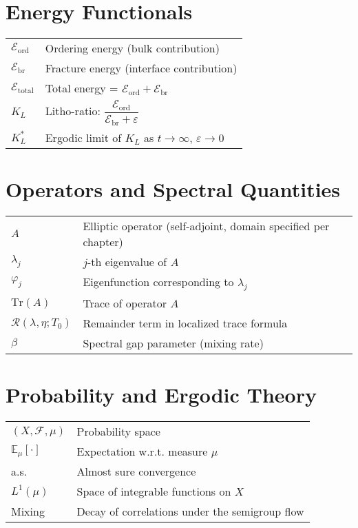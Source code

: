 \section*{Energy Functionals}
\begin{tabular}{ll}
$\mathcal{E}_{\text{ord}}$ & Ordering energy (bulk contribution) \\
$\mathcal{E}_{\text{br}}$ & Fracture energy (interface contribution) \\
$\mathcal{E}_{\text{total}}$ & Total energy = $\mathcal{E}_{\text{ord}} + \mathcal{E}_{\text{br}}$ \\
$K_L$ & Litho-ratio: $\dfrac{\mathcal{E}_{\text{ord}}}{\mathcal{E}_{\text{br}} + \varepsilon}$ \\
$K_L^*$ & Ergodic limit of $K_L$ as $t \to \infty$, $\varepsilon \to 0$ \\
\end{tabular}

\section*{Operators and Spectral Quantities}
\begin{tabular}{ll}
$A$ & Elliptic operator (self-adjoint, domain specified per chapter) \\
$\lambda_j$ & $j$-th eigenvalue of $A$ \\
$\varphi_j$ & Eigenfunction corresponding to $\lambda_j$ \\
$\mathrm{Tr}(A)$ & Trace of operator $A$ \\
$\mathcal{R}(\lambda, \eta; T_0)$ & Remainder term in localized trace formula \\
$\beta$ & Spectral gap parameter (mixing rate) \\
\end{tabular}

\section*{Probability and Ergodic Theory}
\begin{tabular}{ll}
$(X, \mathcal{F}, \mu)$ & Probability space \\
$\mathbb{E}_\mu[\cdot]$ & Expectation w.r.t. measure $\mu$ \\
a.s. & Almost sure convergence \\
$L^1(\mu)$ & Space of integrable functions on $X$ \\
Mixing & Decay of correlations under the semigroup flow \\
\end{tabular}

